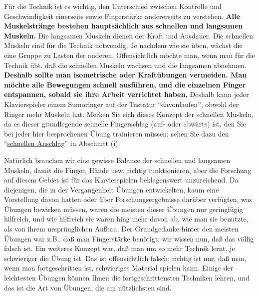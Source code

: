 Für die Technik ist es wichtig, den Unterschied zwischen Kontrolle und Geschwindigkeit einerseits sowie Fingerstärke andererseits zu verstehen.
\textbf{Alle Muskelstränge bestehen hauptsächlich aus schnellen und langsamen Muskeln.}
Die langsamen Muskeln dienen der Kraft und Ausdauer.
Die schnellen Muskeln sind für die Technik notwendig.
Je nachdem wie sie üben, wächst die eine Gruppe zu Lasten der anderen.
Offensichtlich möchte man, wenn man für die Technik übt, daß die schnellen Muskeln wachsen und die langsamen abnehmen.
\textbf{Deshalb sollte man isometrische oder Kraftübungen vermeiden.
Man möchte alle Bewegungen schnell ausführen, und die einzelnen Finger entspannen, sobald sie ihre Arbeit verrichtet haben.}
Deshalb kann jeder Klavierspieler einem Sumoringer auf der Tastatur \enquote{davonlaufen}, obwohl der Ringer mehr Muskeln hat.
Merken Sie sich dieses Konzept der schnellen Muskeln, da es dieser grundlegende schnelle Fingerschlag (auf- oder abwärts) ist, den Sie bei jeder hier besprochenen Übung trainieren müssen; sehen Sie dazu den \enquote{\hyperref[c1iii7i]{schnellen Anschlag}} in Abschnitt (i).

Natürlich brauchen wir eine gewisse Balance der schnellen und langsamen Muskeln, damit die Finger, Hände usw. richtig funktionieren, aber die Forschung auf diesem Gebiet ist für das Klavierspielen beklagenswert unzureichend.
Da diejenigen, die in der Vergangenheit Übungen entwickelten, kaum eine Vorstellung davon hatten oder über Forschungsergebnisse darüber verfügten, was Übungen bewirken müssen, waren die meisten dieser Übungen nur geringfügig hilfreich, und wie hilfreich sie waren hing mehr davon ab, wie man sie benutzte, als von ihrem ursprünglichen Aufbau.
Der Grundgedanke hinter den meisten Übungen war z.B., daß man Fingerstärke benötigt; wir wissen nun, daß das völlig falsch ist.
Ein weiteres Konzept war, daß man um so mehr Technik lernt, je schwieriger die Übung ist.
Das ist offensichtlich falsch; richtig ist nur, daß man, wenn man fortgeschritten ist, schwieriges Material spielen kann.
Einige der leichtesten Übungen können Ihnen die fortgeschrittensten Techniken lehren, und das ist die Art von Übungen, die am nützlichsten sind.



